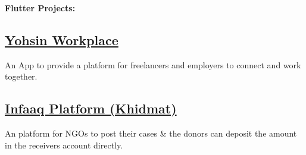 \documentclass[]{m abbas resume' 2022}
\begin{document}
\begin{minipage}[t]{0.45\textwidth}
    \textbf{Flutter Projects:}\\
    
    
    
    
    
    \subsection{\href{https://github.com/smabbasht/yohsin-workplace}{\textbf{Yohsin Workplace}}}
    An App to provide a platform for freelancers and employers to connect and work together.

    \subsection{\href{https://github.com/smabbasht/Infaaq_app}{\textbf{Infaaq Platform (Khidmat)}}}
    An platform for NGOs to post their cases \& the donors can deposit the amount in the receivers account directly.
    

\end{minipage}
\end{document}
